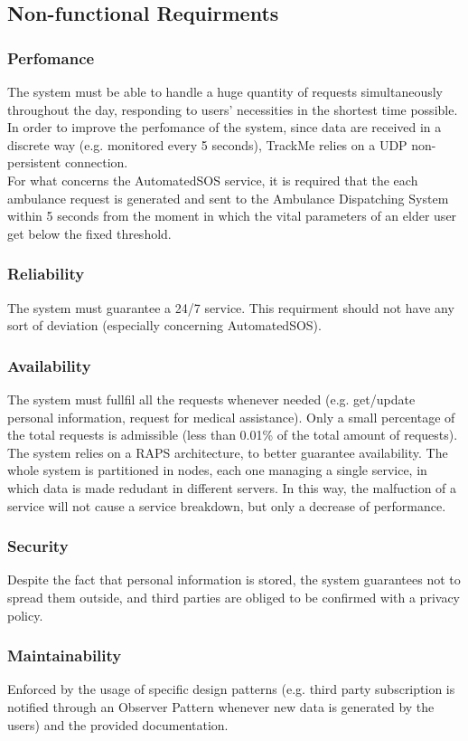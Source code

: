 \documentclass[12pt,a4paper]{article}
\begin{document}
	\subsection{Non-functional Requirments}
	\subsubsection{Perfomance}
	The system must be able to handle a huge quantity of requests simultaneously throughout the day, responding to users' necessities in the shortest time possible. In order to improve the perfomance of the system, since data are received in a discrete way (e.g. monitored every 5 seconds), TrackMe relies on a UDP non-persistent connection.\\
	For what concerns the AutomatedSOS service, it is required that the each ambulance request is generated and sent to the Ambulance Dispatching System within 5 seconds from the moment in which the vital parameters of an elder user get below the fixed threshold.
	\subsubsection{Reliability}
	The system must guarantee a 24/7 service. This requirment should not have any sort of deviation (especially concerning AutomatedSOS).
	\subsubsection{Availability}
	The system must fullfil all the requests whenever needed (e.g. get/update personal information, request for medical assistance). Only a small percentage of the total requests is admissible (less than 0.01\% of the total amount of requests). The system relies on a RAPS architecture, to better guarantee availability. The whole system is partitioned in nodes, each one managing a single service, in which data is made redudant in different servers. In this way, the malfuction of a service will not cause a service breakdown, but only a decrease of performance.
	\subsubsection{Security}
	Despite the fact that personal information is stored, the system guarantees not to spread them outside, and third parties are obliged to be confirmed with a privacy policy.
	\subsubsection{Maintainability}
	Enforced by the usage of specific design patterns (e.g. third party subscription is notified through an Observer Pattern whenever new data is generated by the users) and the provided documentation.
\end{document}
